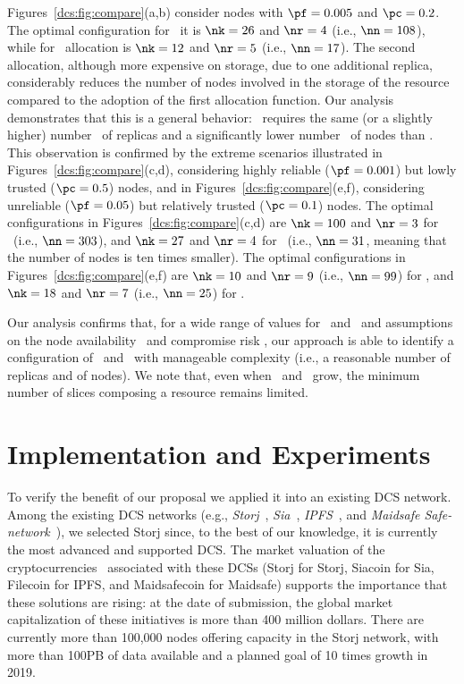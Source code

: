 Figures~\ref{dcs:fig:compare}(a,b) consider nodes with $\pf=0.005$ and
$\pc=0.2$. The optimal configuration for \diagonal\ it is $\nk=26$ and
$\nr=4$ (i.e., $\nn=108$), while for \compact\ allocation is $\nk=12$
and $\nr=5$ (i.e., $\nn=17$). The second allocation, although more
expensive on storage, due to one additional replica, considerably
reduces the number of nodes involved in the storage of the resource
compared to the adoption of the first allocation function. Our
analysis demonstrates that this is a general behavior:
\compact\ requires the same (or a slightly higher) number \R\ of
replicas and a significantly lower number \N\ of nodes than
\diagonal. This observation is confirmed by the extreme scenarios
illustrated in Figures~\ref{dcs:fig:compare}(c,d), considering highly
reliable ($\pf = 0.001$) but lowly trusted ($\pc = 0.5$) nodes, and in
Figures~\ref{dcs:fig:compare}(e,f), considering unreliable ($\pf = 0.05$)
but relatively trusted ($\pc = 0.1$) nodes.  The optimal
configurations in Figures~\ref{dcs:fig:compare}(c,d) are $\nk=100$ and
$\nr=3$ for \diagonal\ (i.e., $\nn=303$), and $\nk=27$ and $\nr=4$ for
\compact\ (i.e., $\nn=31$, meaning that the number of nodes is ten
times smaller). The optimal configurations in
Figures~\ref{dcs:fig:compare}(e,f) are $\nk=10$ and $\nr=9$ (i.e.,
$\nn=99$) for \diagonal, and $\nk=18$ and $\nr=7$ (i.e., $\nn=25$) for
\compact.


Our analysis confirms that, for a wide range of values
for \PF\ and \PC\ and assumptions on the node availability \pf\ and
compromise risk \pc, our approach is able to identify a configuration
of \R\ and \K\ with  manageable complexity (i.e., a reasonable number of replicas and of nodes). We note that, even when
\R\ and \K\ grow, the minimum number of slices composing a resource remains
limited. 




\section[Experiments]{Implementation and Experiments}\label{dcs:sect:implementation}
To verify the benefit of our proposal we applied it into an existing
DCS network. Among the existing DCS networks (e.g., {\em
  Storj}~\cite{wilkinson2014storj}, {\em Sia}~\cite{vorick2014sia},
{\em IPFS}~\cite{benet2014ipfs}, and {\em Maidsafe
  Safe-network}~\cite{lambert2014safenetwork}), we selected Storj
since, to the best of our knowledge, it is currently the most advanced
and supported DCS.  The market valuation of the
cryptocurrencies~\cite{cslr18} associated with these DCSs (Storj for
Storj, Siacoin for Sia, Filecoin for IPFS, and Maidsafecoin for
Maidsafe) supports the importance that these solutions are rising: at
the date of submission, the global market capitalization of these
initiatives is more than 400 million dollars.  There are currently
more than 100,000 nodes offering capacity in the Storj network, with
more than 100PB of data available and a planned goal of 10 times
growth in 2019.

